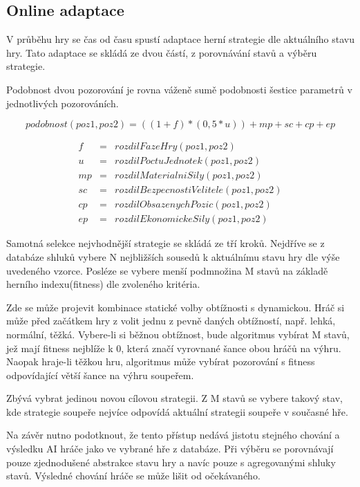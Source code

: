 \subsection{Online adaptace}

V průběhu hry se čas od času spustí adaptace herní strategie dle aktuálního stavu hry. Tato adaptace se skládá ze dvou částí, z porovnávání stavů a výběru strategie.

Podobnost dvou pozorování je rovna váženě sumě podobnosti šestice parametrů v jednotlivých pozorováních.

\begin{equation}
	   podobnost(poz1,poz2)=((1+f)*(0,5*u)) + mp + sc + cp + ep
\end{equation}

\begin{eqnarray*}
f &= &rozdilFazeHry(poz1,poz2) \\
u &= &rozdilPoctuJednotek(poz1,poz2) \\
mp &= &rozdilMaterialniSily(poz1,poz2) \\
sc &= &rozdilBezpecnostiVelitele(poz1,poz2) \\
cp &= &rozdilObsazenychPozic(poz1,poz2) \\
ep &= &rozdilEkonomickeSily(poz1,poz2)
\end{eqnarray*}

Samotná selekce nejvhodnější strategie se skládá ze tří kroků. Nejdříve se z databáze shluků vybere N nejbližších sousedů k aktuálnímu stavu hry dle výše uvedeného vzorce. Posléze se vybere menší podmnožina M stavů na základě herního indexu(fitness) dle zvoleného kritéria.

Zde se může projevit kombinace statické volby obtížnosti s dynamickou. Hráč si může před začátkem hry z volit jednu z pevně daných obtížností, např. lehká, normální, těžká. Vybere-li si běžnou obtížnost, bude algoritmus vybírat M stavů, jež mají fitness nejblíže k 0, která značí vyrovnané šance obou hráčů na výhru. Naopak hraje-li těžkou hru, algoritmus může vybírat pozorování s fitness odpovídající větší šance na výhru soupeřem.

Zbývá vybrat jedinou novou cílovou strategii. Z M stavů se vybere takový stav, kde strategie soupeře nejvíce odpovídá aktuální strategii soupeře v současné hře.

Na závěr nutno podotknout, že tento přístup nedává jistotu stejného chování a výsledku AI hráče jako ve vybrané hře z databáze. Při výběru se porovnávají pouze zjednodušené abstrakce stavu hry a navíc pouze s agregovanými shluky stavů. Výsledné chování hráče se může lišit od očekávaného.


